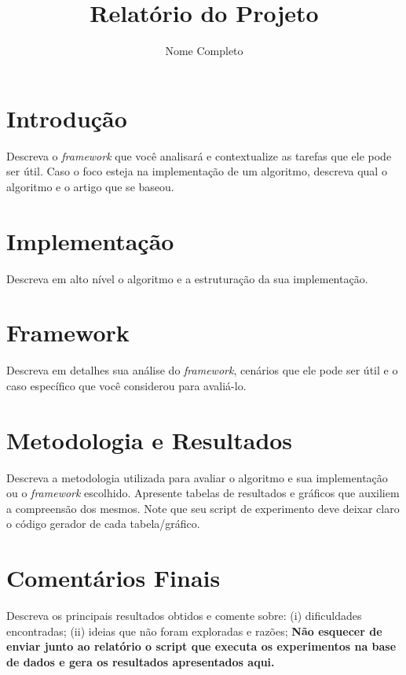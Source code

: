 \documentclass{article}
\title{Relatório do Projeto}
\author{Nome Completo}
\date{}
\begin{document}
\maketitle
\section{Introdução}

Descreva o \textit{framework} que você analisará e contextualize as tarefas que ele pode ser útil.
Caso o foco esteja na implementação de um algoritmo, descreva qual o algoritmo e o artigo que se baseou.

\section{Implementação}

Descreva em alto nível o algoritmo e a estruturação da sua implementação.

\section{Framework}

Descreva em detalhes sua análise do \textit{framework}, cenários que ele pode ser útil e o caso específico que você considerou para avaliá-lo.

\section{Metodologia e Resultados}

Descreva a metodologia utilizada para avaliar o algoritmo e sua implementação ou o \textit{framework} escolhido.
Apresente tabelas de resultados e gráficos que auxiliem a compreensão dos
mesmos.
Note que seu script de experimento deve deixar claro o código gerador de cada tabela/gráfico.

\section{Comentários Finais}

Descreva os principais resultados obtidos e comente sobre:
(i) dificuldades encontradas;
(ii) ideias que não foram exploradas e razões;
\textbf{Não esquecer de enviar junto ao relatório o script que executa os experimentos na base de dados e gera os resultados apresentados aqui.}
\end{document}
